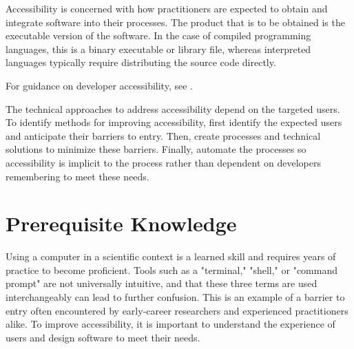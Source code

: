 \documentclass[]{nlr}
\begin{document}
Accessibility is concerned with how practitioners are expected to obtain and integrate software
into their processes. The product that is to be obtained is the executable version of the software.
In the case of compiled programming languages, this is a binary executable or library file,
whereas interpreted languages typically require distributing the source code directly.

For guidance on developer accessibility, see .

The technical approaches to address accessibility depend on the targeted users.
To identify methods for improving accessibility, first identify the expected users and
anticipate their barriers to entry.
Then, create processes and technical solutions to minimize these barriers.
Finally, automate the processes so accessibility is implicit to the process rather than
dependent on developers remembering to meet these needs.

\section{Prerequisite Knowledge}

Using a computer in a scientific context is a learned skill and requires years of practice to
become proficient. Tools such as a "terminal," "shell," or "command prompt" are not universally
intuitive, and that these three terms are used interchangeably can lead to further confusion.
This is an example of a barrier to entry often encountered by early-career researchers and
experienced practitioners alike. To improve accessibility, it is important to
understand the experience of users and design software to meet their needs.
\end{document}
